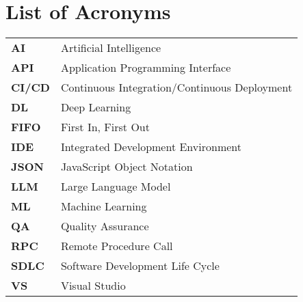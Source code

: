 \chapter*{List of Acronyms}

\begin{spacing}{1.2}

\begin{table}[H]
\centering
\begin{tabular}{p{3cm}p{12cm}}
\textbf{AI} & Artificial Intelligence \\
\textbf{API} & Application Programming Interface \\
\textbf{CI/CD} & Continuous Integration/Continuous Deployment \\
\textbf{DL} & Deep Learning \\
\textbf{FIFO} & First In, First Out \\
\textbf{IDE} & Integrated Development Environment \\
\textbf{JSON} & JavaScript Object Notation \\
\textbf{LLM} & Large Language Model \\
\textbf{ML} & Machine Learning \\
\textbf{QA} & Quality Assurance \\
\textbf{RPC} & Remote Procedure Call \\
\textbf{SDLC} & Software Development Life Cycle \\
\textbf{VS} & Visual Studio \\
\end{tabular}
\end{table}

\end{spacing}

